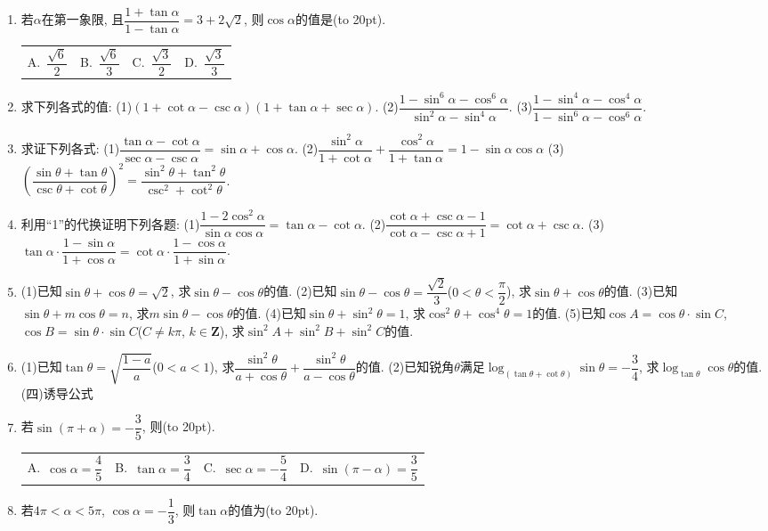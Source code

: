 \documentclass[10pt,a4paper]{article}
\newcommand{\bracket}[1]{(\hbox to #1pt{})}
\newcommand{\fourch}[4]{\par\begin{tabular}{p{.23\textwidth}p{.23\textwidth}p{.23\textwidth}p{.23\textwidth}}
A.~#1 &B.~#2& C.~#3& D.~#4
\end{tabular}}
\begin{document}
\begin{enumerate}[1.]
\fourch{$\dfrac{4ab}{a^2-b^2}$}{$-\dfrac{4ab}{a^2-b^2}$}{$\dfrac{4ab}{a^2+b^2}$}{$-\dfrac{4ab}{a^2+b^2}$}
\item 若$\alpha$在第一象限, 且$\dfrac{1+\tan \alpha }{1-\tan \alpha }=3+2\sqrt 2$, 则$\cos \alpha$的值是\bracket{20}.
\fourch{$\dfrac{\sqrt 6}2$}{$\dfrac{\sqrt 6}3$}{$\dfrac{\sqrt 3}2$}{$\dfrac{\sqrt 3}3$}
\item 求下列各式的值:
(1)$(1+\cot \alpha -\csc \alpha)(1+\tan \alpha +\sec \alpha)$.		(2)$\dfrac{1-\sin ^6\alpha -\cos ^6\alpha }{\sin ^2\alpha -\sin ^4\alpha }$.
(3)$\dfrac{1-\sin ^4\alpha -\cos ^4\alpha }{1-\sin ^6\alpha -\cos ^6\alpha }$.
\item 求证下列各式:
(1)$\dfrac{\tan \alpha -\cot \alpha }{\sec \alpha -\csc \alpha }=\sin \alpha +\cos \alpha$.		(2)$\dfrac{\sin ^2\alpha }{1+\cot \alpha }+\dfrac{\cos ^2\alpha }{1+\tan \alpha }=1-\sin \alpha \cos \alpha$
(3)$(\dfrac{\sin \theta +\tan \theta }{\csc \theta +\cot \theta })^2=\dfrac{\sin ^2\theta +\tan ^2\theta }{\csc ^2+\cot ^2\theta }$.
\item 利用``1''的代换证明下列各题:
(1)$\dfrac{1-2\cos ^2\alpha }{\sin \alpha \cos \alpha }=\tan \alpha -\cot \alpha$.			(2)$\dfrac{\cot \alpha +\csc \alpha -1}{\cot \alpha -\csc \alpha +1}=\cot \alpha +\csc \alpha$.
(3)$\tan \alpha \cdot \dfrac{1-\sin \alpha }{1+\cos \alpha }=\cot \alpha \cdot \dfrac{1-\cos \alpha }{1+\sin \alpha }$.
\item (1)已知$\sin \theta +\cos \theta =\sqrt 2$, 求$\sin \theta -\cos \theta$的值.
(2)已知$\sin \theta -\cos \theta =\dfrac{\sqrt 2}3$($0<\theta <\dfrac{\pi }2$), 求$\sin \theta +\cos \theta$的值.
(3)已知$\sin \theta +m\cos \theta =n$, 求$m\sin \theta -\cos \theta$的值.
(4)已知$\sin \theta +\sin ^2\theta =1$, 求$\cos ^2\theta +\cos ^4\theta =1$的值.
(5)已知$\cos A=\cos \theta \cdot \sin C$, $\cos B=\sin \theta \cdot \sin C$($C\ne k\pi$, $k\in \mathbf{Z}$), 求$\sin ^2A+\sin ^2B+\sin ^2C$的值.
\item (1)已知$\tan \theta =\sqrt {\dfrac{1-a}a}$($0<a<1$), 求$\dfrac{\sin ^2\theta }{a+\cos \theta }+\dfrac{\sin ^2\theta }{a-\cos \theta }$的值.
(2)已知锐角$\theta$满足$\log _{(\tan \theta +\cot \theta)}\sin \theta =-\dfrac 34$, 求$\log _{\tan \theta }\cos \theta$的值.
(四)诱导公式
\item 若$\sin (\pi +\alpha)=-\dfrac 35$, 则\bracket{20}.
\fourch{$\cos \alpha =\dfrac 45$}{$\tan \alpha =\dfrac 34$}{$\sec \alpha =-\dfrac 54$}{$\sin (\pi -\alpha)=\dfrac 35$}
\item 若$4\pi <\alpha <5\pi$, $\cos \alpha =-\dfrac 13$, 则$\tan \alpha$的值为\bracket{20}.

\end{enumerate}
\end{document}
